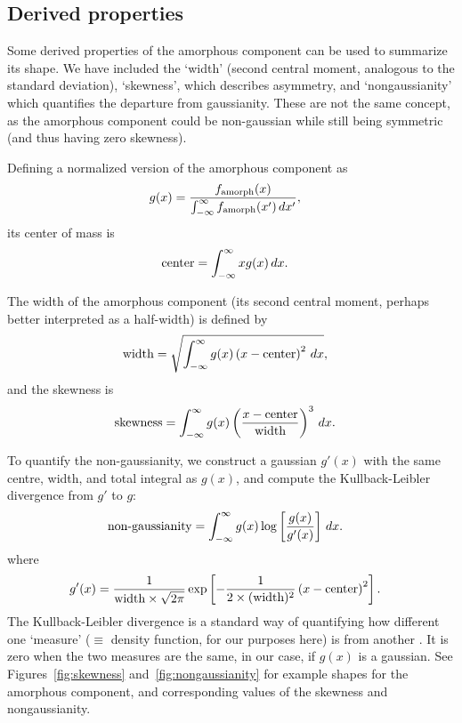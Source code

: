 \documentclass[review]{elsarticle}
\newcommand{\x}{x}
\newcommand{\changed}{\color{blue}}
\begin{document}
\subsection{Derived properties}
Some derived properties of the amorphous component can be used to summarize its shape.
We have included {\changed the `width' (second central moment, analogous to the standard
deviation)}, `skewness', which describes asymmetry, and `nongaussianity'
which quantifies the departure from gaussianity. These are not the same
concept, as the amorphous component could be non-gaussian while still being symmetric
(and thus having zero skewness).

Defining a normalized version of the amorphous component as
\begin{align}
g(\x) &= \frac{f_{\rm amorph}(\x)}
             {\int_{-\infty}^\infty f_{\rm amorph}(\x') \, d\x'},
\end{align}
its center of mass is
\begin{align}
\textnormal{center} &= \int_{-\infty}^\infty x g(\x) \, d\x.
\end{align}

The width of the amorphous component
(its second central moment, perhaps better interpreted
as a half-width) is defined by
\begin{align}
\textnormal{width} &= \sqrt{\int_{-\infty}^\infty
                            g(\x) \left(\x - \textnormal{center}\right)^2
                            \, d\x},
\end{align}
and the skewness is
\begin{align}
\textnormal{skewness} &= \int_{-\infty}^\infty
                           g(\x) 
                           \left(
                             \frac{x - \textnormal{center}}{\textnormal{width}}
                           \right)^3
                         \, d\x.
\end{align}

To quantify the non-gaussianity, we construct a gaussian
$g'(\x)$
with the same centre, width, and total integral as $g(\x)$, and compute the
Kullback-Leibler divergence from $g'$ to $g$:
\begin{align}
\textnormal{non-gaussianity} &= 
    \int_{-\infty}^\infty g(\x) \log\left[\frac{g(\x)}{g'(\x)}\right] \, d\x.
\end{align}
where
\begin{align}
g'(\x) &= \frac{1}{\textnormal{width} \times \sqrt{2\pi}}
            \exp\left[-\frac{1}{2\times (\textnormal{width})^2}
                    \left(\x - \textnormal{center}\right)^2\right].
\end{align}
The Kullback-Leibler divergence is a standard way of quantifying how
different one `measure' ($\equiv$ density function, for our purposes here) is from another \citep{knuth2012foundations}.
It is zero when the two measures are the same, in our case,
if $g(\x)$ is a gaussian. See Figures~\ref{fig:skewness} and~\ref{fig:nongaussianity} for example
shapes for the amorphous component, and corresponding values of the skewness
and nongaussianity.
\end{document}
